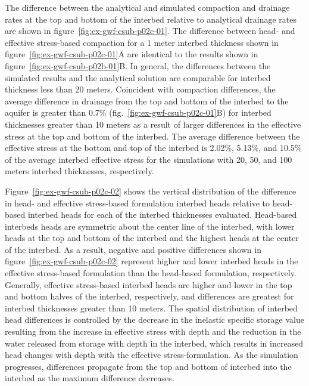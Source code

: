 The difference between the analytical and simulated compaction and drainage rates at the top and bottom of the interbed relative to analytical drainage rates are shown in figure~\ref{fig:ex-gwf-csub-p02c-01}. The difference between head- and effective stress-based compaction for a 1 meter interbed thickness shown in figure~\ref{fig:ex-gwf-csub-p02c-01}A are identical to the results shown in figure~\ref{fig:ex-gwf-csub-p02b-01}B. In general, the differences between the simulated results and the analytical solution are comparable for interbed thickness less than 20 meters. Coincident with compaction differences, the average difference in drainage from the top and bottom of the interbed to the aquifer is greater than 0.7\%  (fig.~\ref{fig:ex-gwf-csub-p02c-01}B) for interbed thicknesses greater than 10 meters as a result of larger differences in the effective stress at the top and bottom of the interbed. The average difference between the effective stress at the bottom and top of the interbed is 2.02\%, 5.13\%, and 10.5\% of the average interbed effective stress for the simulations with 20, 50, and 100 meters interbed thicknesses, respectively.

Figure~\ref{fig:ex-gwf-csub-p02c-02} shows the vertical distribution of the difference in head- and effective stress-based formulation interbed heads relative to head-based interbed heads for each of the interbed thicknesses evaluated. Head-based interbeds heads are symmetric about the center line of the interbed, with lower heads at the top and bottom of the interbed and the highest heads at the center of the interbed. As a result, negative and positive differences shown in figure~\ref{fig:ex-gwf-csub-p02c-02} represent higher and lower interbed heads in the effective stress-based formulation than the head-based formulation, respectively. Generally, effective stress-based interbed heads are higher and lower in the top and bottom halves of the interbed, respectively, and differences are greatest for interbed thicknesses greater than 10 meters. The spatial distribution of interbed head differences is controlled by the decrease in the inelastic specific storage value resulting from the increase in effective stress with depth and the reduction in the water released from storage with depth in the interbed, which results in increased head changes with depth with the effective stress-formulation. As the simulation progresses, differences propagate from the top and bottom of interbed into the interbed as the maximum difference decreases.

